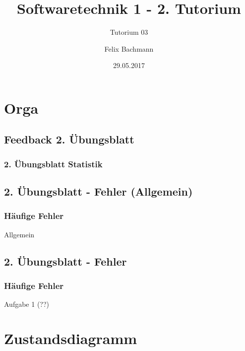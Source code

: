 \documentclass[18pt]{beamer}
\title[SWT1]{Softwaretechnik 1 - 2. Tutorium}
\subtitle{Tutorium 03}
\author{Felix Bachmann}
\date{29.05.2017}
\institute{KIT - Institut für Programmstrukturen und Datenorganisation (IPD)}
\begin{document}

\begin{frame}
\titlepage
\end{frame}

\section{Orga}
	\subsection{Feedback 2. Übungsblatt}
	\begin{frame}
		\frametitle{2. Übungsblatt Statistik}
	\end{frame}
	
	\subsection{2. Übungsblatt - Fehler (Allgemein)}
	\begin{frame}
		\frametitle{Häufige Fehler}
		\begin{block}{Allgemein}
		\end{block}
	\end{frame}
	
	\subsection{2. Übungsblatt - Fehler}
	\begin{frame}
		\frametitle{Häufige Fehler}
		\begin{block}{Aufgabe 1 (??)}
		\end{block}
	\end{frame}


\section{Zustandsdiagramm}
\end{document}
